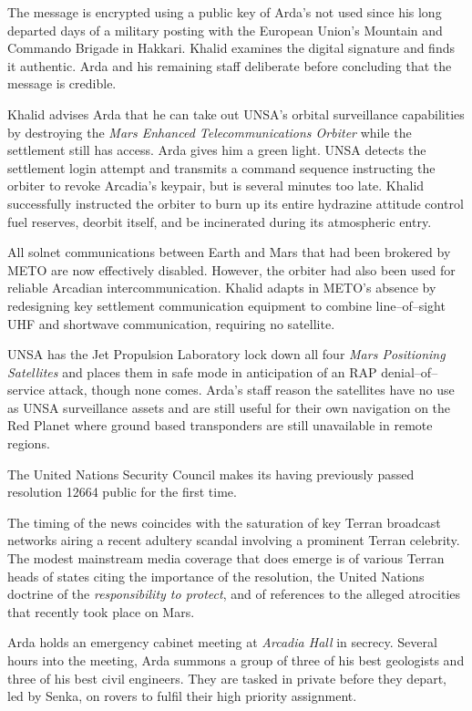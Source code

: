 The message is encrypted using a public key of Arda's not used since his long departed days of a military posting with the European Union's Mountain and Commando Brigade in Hakkari. Khalid examines the digital signature and finds it authentic. Arda and his remaining staff deliberate before concluding that the message is credible.
\StopTimelineDate

Khalid advises Arda that he can take out UNSA's orbital surveillance capabilities by destroying the {\it Mars Enhanced Telecommunications Orbiter} while the settlement still has access. Arda gives him a green light. UNSA detects the settlement login attempt and transmits a command sequence instructing the orbiter to revoke Arcadia's keypair, but is several minutes too late. Khalid successfully instructed the orbiter to burn up its entire hydrazine attitude control fuel reserves, deorbit itself, and be incinerated during its atmospheric entry.

All solnet communications between Earth and Mars that had been brokered by METO are now effectively disabled. However, the orbiter had also been used for reliable Arcadian intercommunication. Khalid adapts in METO's absence by redesigning key settlement communication equipment to combine line--of--sight UHF and shortwave communication, requiring no satellite.

UNSA has the Jet Propulsion Laboratory lock down all four {\it Mars Positioning Satellites} and places them in safe mode in anticipation of an RAP denial--of--service attack, though none comes. Arda's staff reason the satellites have no use as UNSA surveillance assets and are still useful for their own navigation on the Red Planet where ground based transponders are still unavailable in remote regions.
\StopTimelineDate

The United Nations Security Council makes its having previously passed resolution 12664 public for the first time. 

The timing of the news coincides with the saturation of key Terran broadcast networks airing a recent adultery scandal involving a prominent Terran celebrity. The modest mainstream media coverage that does emerge is of various Terran heads of states citing the importance of the resolution, the United Nations doctrine of the {\it responsibility to protect}, and of references to the alleged atrocities that recently took place on Mars.
\StopTimelineDate

Arda holds an emergency cabinet meeting at {\it Arcadia Hall} in secrecy. Several hours into the meeting, Arda summons a group of three of his best geologists and three of his best civil engineers. They are tasked in private before they depart, led by Senka, on rovers to fulfil their high priority assignment.
\StopTimelineDate

